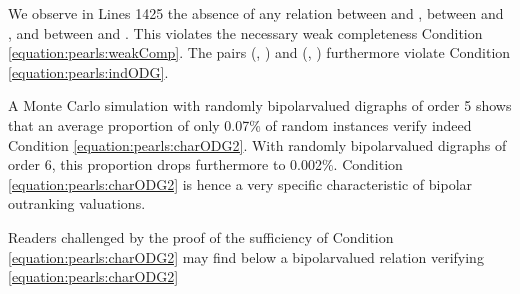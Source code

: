 \documentclass[a4paper,12pt,english]{sphinxhowto}
\begin{document}
\sphinxAtStartPar
We observe in Lines 14\sphinxhyphen{}25 the absence of any relation between  and , between  and , and between  and . This violates the necessary weak completeness Condition \eqref{equation:pearls:weakComp}. The pairs (, ) and (, ) furthermore violate Condition \eqref{equation:pearls:indODG}.

\sphinxAtStartPar
A Monte Carlo simulation with randomly bipolar\sphinxhyphen{}valued digraphs of order 5 shows that an average proportion of only 0.07\% of random instances verify indeed Condition \eqref{equation:pearls:charODG2}. With randomly bipolar\sphinxhyphen{}valued digraphs of order 6, this proportion drops furthermore to 0.002\%. Condition \eqref{equation:pearls:charODG2} is hence a very specific characteristic of bipolar outranking valuations.

\sphinxAtStartPar
Readers challenged by the proof of the sufficiency of Condition \eqref{equation:pearls:charODG2} may find below a bipolar\sphinxhyphen{}valued relation verifying \eqref{equation:pearls:charODG2}

\begin{sphinxVerbatim}[commandchars=\\\{\},numbers=left,firstnumber=1,stepnumber=1]
\end{sphinxVerbatim}
\end{document}
